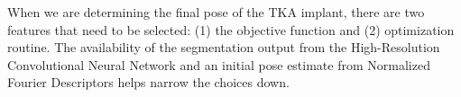 
When we are determining the final pose of the TKA implant, there are two features that need to be selected: (1) the objective function and (2) optimization routine. The availability of the segmentation output from the High-Resolution Convolutional Neural Network and an initial pose estimate from Normalized Fourier Descriptors helps narrow the choices down.

